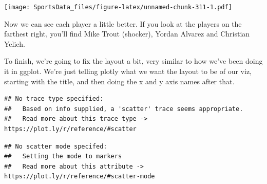 \documentclass[
]{book}
\newenvironment{Shaded}{\begin{snugshade}}{\end{snugshade}}
\newcommand{\DataTypeTok}[1]{\textcolor[rgb]{0.13,0.29,0.53}{#1}}
\newcommand{\KeywordTok}[1]{\textcolor[rgb]{0.13,0.29,0.53}{\textbf{#1}}}
\newcommand{\NormalTok}[1]{#1}
\newcommand{\OperatorTok}[1]{\textcolor[rgb]{0.81,0.36,0.00}{\textbf{#1}}}
\newcommand{\StringTok}[1]{\textcolor[rgb]{0.31,0.60,0.02}{#1}}
\begin{document}
\texttt{[image: SportsData\_files/figure-latex/unnamed-chunk-311-1.pdf]}

Now we can see each player a little better. If you look at the players on the farthest right, you'll find Mike Trout (shocker), Yordan Alvarez and Christian Yelich.

To finish, we're going to fix the layout a bit, very similar to how we've been doing it in ggplot. We're just telling plotly what we want the layout to be of our viz, starting with the title, and then doing the x and y axis names after that.

\begin{Shaded}
\end{Shaded}

\begin{verbatim}
## No trace type specified:
##   Based on info supplied, a 'scatter' trace seems appropriate.
##   Read more about this trace type -> https://plot.ly/r/reference/#scatter
\end{verbatim}

\begin{verbatim}
## No scatter mode specifed:
##   Setting the mode to markers
##   Read more about this attribute -> https://plot.ly/r/reference/#scatter-mode
\end{verbatim}
\end{document}
